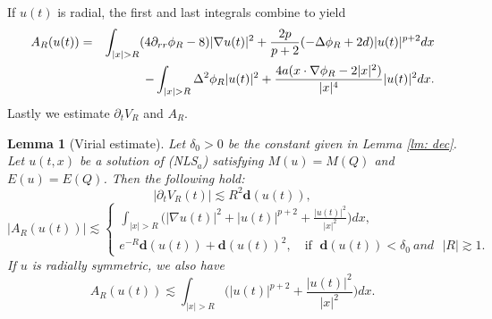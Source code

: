 \documentclass[12pt]{amsart}
\newtheorem{lemma}[theorem]{Lemma}
\begin{document}
If  $u(t)$ is radial, the first and last integrals combine to yield
\begin{eqnarray}
A_{R}(u(t)) &=&\int_{|x|>R}(4\partial _{rr}\phi _{R}-8)|\nabla u(t)|^{2}+%
\frac{2p}{p+2}(-\Delta \phi _{R}+2d)|u(t)|^{p+2}dx \label{459}\\
&&-\int_{|x|>R}\Delta ^{2}\phi _{R}|u(t)|^{2}+\frac{4a(x\cdot \nabla \phi
_{R}-2|x|^{2})}{|x|^{4}}|u(t)|^{2}dx.\notag
\end{eqnarray}
Lastly we estimate $\partial_{t}V_{R} $ and $A_{R}$. 


\begin{lemma}[Virial estimate]\label{LV} 
Let $\delta_0>0$ be the constant given in Lemma \ref{lm: dec}. Let $u(t,x)$ be a solution of (NLS$_{a}$) satisfying $M(u)=M(Q)$ and $%
E(u)=E(Q)$. Then the following  hold:
\begin{equation}
|\partial _{t}V_{R}(t)|\lesssim R^{2}\mathbf{d}(u(t)),  \label{VR}
\end{equation}%
\begin{equation}
|A_{R}(u(t))|\lesssim \left\{ 
\begin{array}{l}
\int_{|x|>R}\bigl(|\nabla u(t)|^{2}+|u(t)|^{p+2}+\frac{|u(t)|^{2}}{|x|^{2}}%
\bigr)dx, \\ 
e^{-R}\mathbf{d}(u(t))+\mathbf{d}(u(t))^{2},\ \ \mathit{\ }\text{ if } \; \mathbf{d}%
(u(t))<\delta _{0}\mathit{\ and}\text{ }|R|\gtrsim 1.
\end{array}%
\right.  \label{AR2}
\end{equation}%
If $u$ is radially symmetric, we also have 
\begin{equation}
A_{R}(u(t))\lesssim \int_{|x|>R}\bigr(|u(t)|^{p+2}+\frac{|u(t)|^{2}}{|x|^{2}}%
\bigr)dx.  \label{AR1}
\end{equation}%
\end{lemma}
\end{document}
